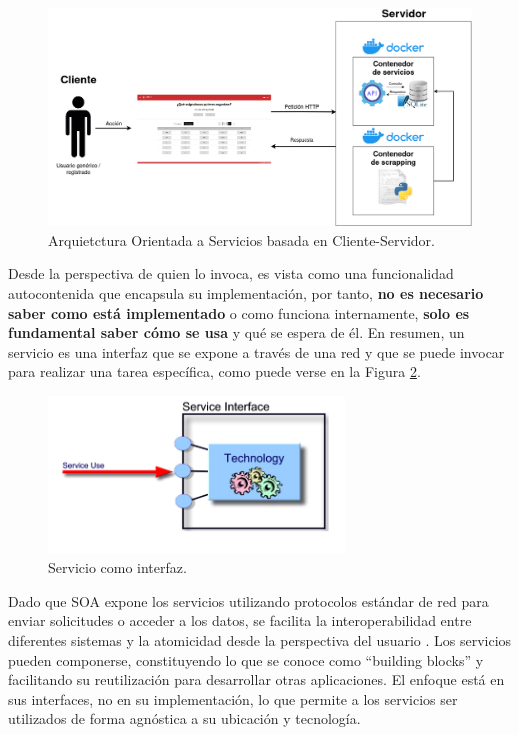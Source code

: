 \begin{figure}[H]
    \centering
    \includegraphics[width=1\textwidth]{./imagenes/Arq_Soft_informal.png}
    \caption{Arquietctura Orientada a Servicios basada en Cliente-Servidor.}
    \label{fig:soa}
\end{figure}

Desde la perspectiva de quien lo invoca, es vista como una funcionalidad autocontenida que encapsula su implementación, por tanto, \textbf{no es necesario saber como está implementado} o como funciona internamente, \textbf{solo es fundamental saber cómo se usa} y qué se espera de él. En resumen, un servicio es una interfaz que se expone a través de una red y que se puede invocar para realizar una tarea específica, como puede verse en la Figura \ref{fig:soa_interface}.\newline

\begin{figure}[H]
    \centering
    \includegraphics[width=0.7\textwidth]{./imagenes/Interfaz_SOA.png}
    \caption{Servicio como interfaz.}
    \label{fig:soa_interface}
\end{figure}

Dado que SOA expone los servicios utilizando protocolos estándar de red para enviar solicitudes o acceder a los datos, se facilita la interoperabilidad entre diferentes sistemas y la atomicidad desde la perspectiva del usuario \cite{laskey2009service, 1210138}. Los servicios pueden componerse, constituyendo lo que se conoce como ``building blocks'' y facilitando su reutilización para desarrollar otras aplicaciones. El enfoque está en sus interfaces, no en su implementación, lo que permite a los servicios ser utilizados de forma agnóstica a su ubicación y tecnología.\newline

